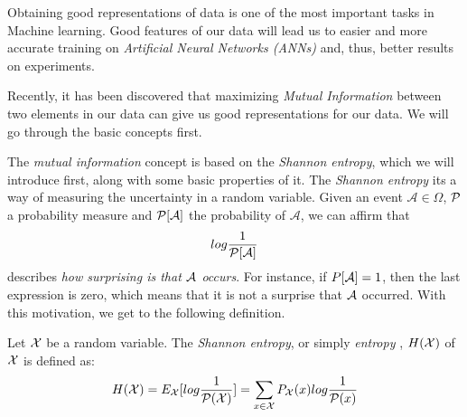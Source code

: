 Obtaining good representations of data is one of the most important tasks in Machine learning. Good features of our data will lead us to easier and more accurate training on \emph{Artificial Neural Networks (ANNs)} and, thus, better results on experiments.

Recently, it has been discovered that maximizing \emph{Mutual Information} between two elements in our data can give us good representations for our data. We will go through the basic concepts first.

The \emph{mutual information} concept is based on the \emph{Shannon entropy}, which we will introduce first, along with some basic properties of it. The \emph{Shannon entropy} its a way of measuring the uncertainty in a random variable. Given an event $\mathcal A \in \Omega$, $\mathcal{P}$ a probability measure and $\mathcal{P}[\mathcal A]$ the probability of $\mathcal A$, we can affirm that 
$$
log\frac{1}{\mathcal{P}[\mathcal A]}
$$
describes \emph{how surprising is that $\mathcal A$ occurs}. For instance, if $P[\mathcal A] = 1$, then the last expression is zero, which means that it is not a surprise that $\mathcal A$ occurred. With this motivation, we get to the following definition.

\begin{ndef}
Let $\mathcal{X}$ be a random variable. The \emph{Shannon entropy}, or simply \emph{entropy} , $H(\mathcal{X})$ of $\mathcal{X}$ is defined as:
$$
H(\mathcal{X}) = E_{\mathcal{X}}[log\frac{1}{\mathcal{P}(\mathcal{X})}] =  \sum_{x \in \mathcal{X}} P_{\mathcal{X}}(x) log\frac{1}{\mathcal{P}(x)}
$$
\end{ndef}



